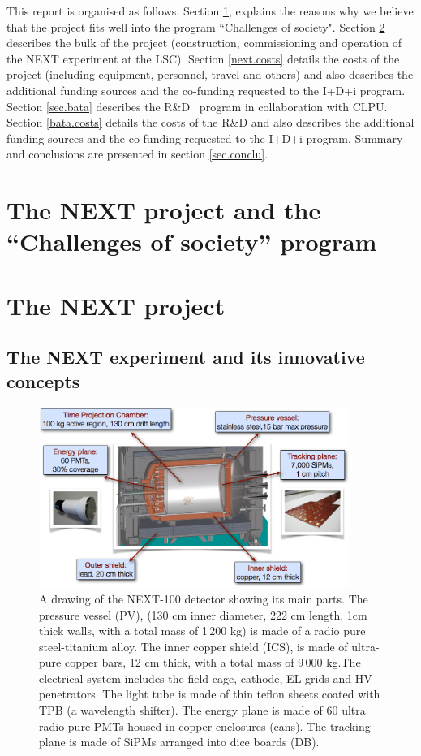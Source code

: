 \documentclass[a4paper,11pt,oneside]{article}
\begin{document}
This report is organised as follows. Section \ref{sec.retos}, explains the reasons why we believe that the project fits well into the program ``Challenges of society". Section \ref{sec.next} describes the bulk of the project (construction, commissioning and operation of the NEXT experiment at the LSC). Section \ref{next.costs} details the costs of the project (including equipment, personnel, travel and others) and also describes the additional funding sources and the co-funding requested to the I+D+i program.  Section \ref{sec.bata} describes the R\&D \BATA\ program in collaboration with CLPU. Section \ref{bata.costs} details the costs of the R\&D and also describes the additional funding sources and the co-funding requested to the I+D+i program.  Summary and conclusions are presented
in section \ref{sec.conclu}.

\section{\bf The NEXT project and the ``Challenges of society'' program }
\label{sec.retos}


\section{\bf The NEXT project}
\label{sec.next}

\subsection*{The NEXT experiment and its innovative concepts}

\begin{figure}
\centering
\includegraphics[width=0.9\textwidth]{img/NEXT.png}
\caption{\small A drawing of the NEXT-100 detector showing its main parts.  The pressure vessel (PV),  (130 cm inner diameter, 222 cm length, 1cm thick walls, with a total mass of 1\,200 kg) is made of a radio pure steel-titanium alloy.
The inner copper shield (ICS), is made of ultra-pure copper bars, 12 cm thick, with a total mass of 9\,000 kg.The electrical system includes the field cage, cathode, EL grids and HV penetrators.
The light tube is made of thin teflon sheets coated with TPB (a wavelength shifter). 
The energy plane is made of 60 ultra radio pure PMTs housed in copper enclosures (cans).
The tracking plane is made of SiPMs arranged into dice boards (DB). 
}
\end{figure}
\end{document}
